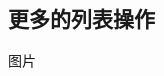 \documentclass[11pt,oneside]{book}
\begin{document}
\begin{common-format}
\section{更多的列表操作}
%
%
%
%
%
%
%
%
%
%
%
%
图片







\end{common-format}
\end{document}
